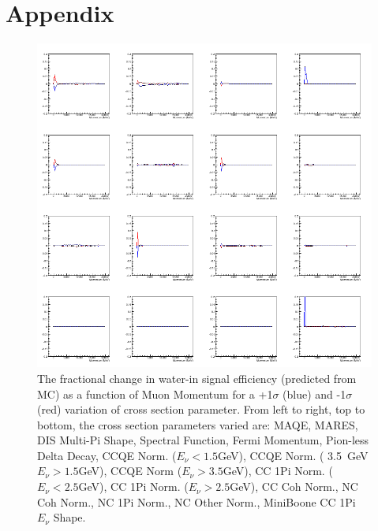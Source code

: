 \section{Appendix}
\label{sec:appendix}


\begin{figure}[H]
\centering
\includegraphics[width=5in]{Figures/TN100Plots/c_7_0.png}
\caption{The fractional change in water-in signal efficiency (predicted from MC) as a function of Muon Momentum for a +1$\sigma$ (blue) and -1$\sigma$ (red) variation of cross section parameter. From left to right, top to bottom, the cross section parameters varied are: MAQE, MARES, DIS Multi-Pi Shape, Spectral Function, Fermi Momentum, Pion-less Delta Decay, CCQE Norm. ($E_\nu < 1.5$GeV), CCQE Norm. ( 3.5~GeV$E_\nu>1.5$GeV), CCQE Norm ($E_\nu > 3.5$GeV), CC 1Pi Norm. ($E_\nu < 2.5$GeV), CC 1Pi Norm. ($E_\nu > 2.5$GeV), CC Coh Norm., NC Coh Norm., NC 1Pi Norm., NC Other Norm., MiniBoone CC 1Pi $E_\nu$ Shape.}
\label{fig:xsvarPwE}
\end{figure}

